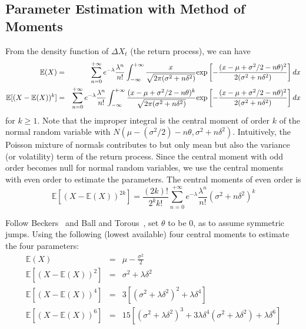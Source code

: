 \documentclass[11pt,reqno,final]{amsart}
\def\exp{\hbox{\rm exp}}
\begin{document}
\subsection{Parameter Estimation with Method of Moments}
From the density function of $\Delta X_t$ (the return process), we can have
\begin{eqnarray*}
\mathbb{E}(X) &=& \sum_{n=0}^{+\infty} e^{-\lambda}\frac{\lambda^n}{n!} \int_{-\infty}^{+\infty} \frac{x}{\sqrt{2\pi(\sigma^2+n\delta^2)}} \exp\left[ -\frac{(x-\mu+\sigma^2/2 -n\theta)^2}{2(\sigma^2+n\delta^2)} \right] dx \\
\mathbb{E}[(X-\mathbb{E}(X))^k] &=& \sum_{n=0}^{+\infty} e^{-\lambda}\frac{\lambda^n}{n!} \int_{-\infty}^{+\infty} \frac{(x-\mu+\sigma^2/2 -n\theta)^k}{\sqrt{2\pi(\sigma^2+n\delta^2)}} \exp\left[ -\frac{(x-\mu+\sigma^2/2 -n\theta)^2}{2(\sigma^2+n\delta^2)} \right] dx \\
\end{eqnarray*}
for $k\geq 1$. Note that the improper integral is the central moment of order $k$ of the normal random variable with $N(\mu-(\sigma^2/2)-n\theta, \sigma^2+n\delta^2)$. Intuitively, the Poisson mixture of normals contributes to but only mean but also the variance (or volatility) term of the return process. Since the central moment with odd order becomes null for normal random variables, we use the central moments with even order to estimate the parameters. The central moments of even order is
$$
\mathbb{E}[(X-\mathbb{E}(X))^{2k}] = \frac{(2k)!}{2^k k!} \sum_{n=0}^{+\infty} e^{-\lambda}\frac{\lambda^n}{n!} (\sigma^2 + n\delta^2)^k
$$

Follow Beckers~\cite{B81} and Ball and Torous~\cite{BT85}, set $\theta$ to be 0, as to assume symmetric jumps. Using the following (lowest available) four central moments to estimate the four parameters:
\begin{eqnarray*}
\mathbb{E}(X)                       &=& \mu - \frac{\sigma^2}{2}  \\
\mathbb{E}[(X-\mathbb{E}(X))^{2}]   &=& \sigma^2 + \lambda\delta^2 \\
\mathbb{E}[(X-\mathbb{E}(X))^{4}]   &=& 3[(\sigma^2+\lambda\delta^2)^2+\lambda\delta^4] \\
\mathbb{E}[(X-\mathbb{E}(X))^{6}]   &=& 15[(\sigma^2+\lambda\delta^2)^3 + 3\lambda\delta^4(\sigma^2+\lambda\delta^2)+\lambda\delta^6] \\
\end{eqnarray*}
\end{document}

